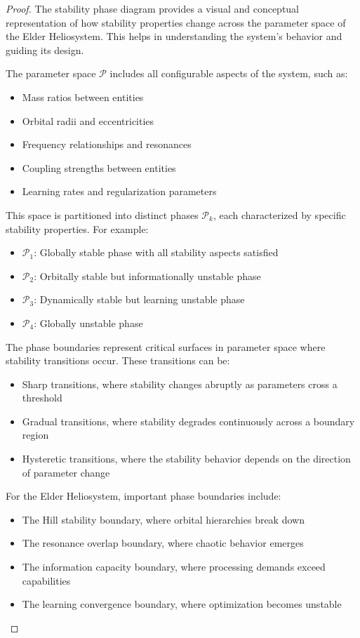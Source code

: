 \begin{proof}
The stability phase diagram provides a visual and conceptual representation of how stability properties change across the parameter space of the Elder Heliosystem. This helps in understanding the system's behavior and guiding its design.

The parameter space $\mathcal{P}$ includes all configurable aspects of the system, such as:
\begin{itemize}
    \item Mass ratios between entities
    \item Orbital radii and eccentricities
    \item Frequency relationships and resonances
    \item Coupling strengths between entities
    \item Learning rates and regularization parameters
\end{itemize}

This space is partitioned into distinct phases $\mathcal{P}_k$, each characterized by specific stability properties. For example:
\begin{itemize}
    \item $\mathcal{P}_1$: Globally stable phase with all stability aspects satisfied
    \item $\mathcal{P}_2$: Orbitally stable but informationally unstable phase
    \item $\mathcal{P}_3$: Dynamically stable but learning unstable phase
    \item $\mathcal{P}_4$: Globally unstable phase
\end{itemize}

The phase boundaries represent critical surfaces in parameter space where stability transitions occur. These transitions can be:
\begin{itemize}
    \item Sharp transitions, where stability changes abruptly as parameters cross a threshold
    \item Gradual transitions, where stability degrades continuously across a boundary region
    \item Hysteretic transitions, where the stability behavior depends on the direction of parameter change
\end{itemize}

For the Elder Heliosystem, important phase boundaries include:
\begin{itemize}
    \item The Hill stability boundary, where orbital hierarchies break down
    \item The resonance overlap boundary, where chaotic behavior emerges
    \item The information capacity boundary, where processing demands exceed capabilities
    \item The learning convergence boundary, where optimization becomes unstable
\end{itemize}


\end{proof}
